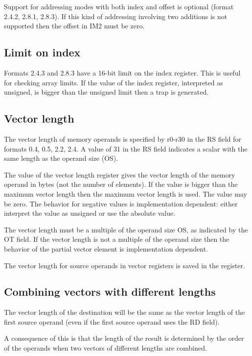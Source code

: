 \documentclass[forwardcom.tex]{subfiles}
\begin{document}
Support for addressing modes with both index and offset is optional (format 2.4.2, 2.8.1, 2.8.3). If this kind of addressing involving two additions is not supported then the offset in IM2 must be zero.

\subsection{Limit on index}
Formats 2.4.3 and 2.8.3 have a 16-bit limit on the index register. This is useful for checking array limits. If the value of the index register, interpreted as unsigned, is bigger than the unsigned limit then a trap is generated.

\subsection{Vector length}
The vector length of memory operands is specified by r0-r30 in the RS field for formats 0.4, 0.5, 2.2, 2.4. A value of 31 in the RS field indicates a scalar with the same length as the operand size (OS).
\vspace{2mm}

The value of the vector length register gives the vector length of the memory operand in bytes (not the number of elements). If the value is bigger than the maximum vector length then the maximum vector length is used. The value may be zero. The behavior for negative values is implementation dependent: either interpret the value as unsigned or use the absolute value.
\vspace{2mm}

The vector length must be a multiple of the operand size OS, as indicated by the OT field. If the vector length is not a multiple of the operand size then the behavior of the partial vector element is implementation dependent.
\vspace{2mm}

The vector length for source operands in vector registers is saved in the register.

\subsection{Combining vectors with different lengths}
The vector length of the destination will be the same as the vector length of the first source operand (even if the first source operand uses the RD field).
\vspace{2mm}

A consequence of this is that the length of the result is determined by the order of the operands when two vectors of different lengths are combined.
\vspace{2mm}
\end{document}
